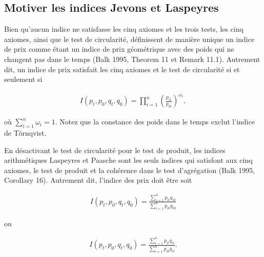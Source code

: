 \documentclass[
]{article}
\begin{document}
\hypertarget{motiver-les-indices-jevons-et-laspeyres}{%
\subsection{Motiver les indices Jevons et Laspeyres}\label{motiver-les-indices-jevons-et-laspeyres}}

Bien qu'aucun indice ne satisfasse les cinq axiomes et les trois tests, les cinq axiomes, ainsi que le test de circularité, définissent de manière unique un indice de prix comme étant un indice de prix géométrique avec des poids qui ne changent pas dans le temps (Balk 1995, Theorem 11 et Remark 11.1). Autrement dit, un indice de prix satisfait les cinq axiomes et le test de circularité si et seulement si

\begin{align*}
I(p_{t}, p_{0}, q_{t}, q_{0}) = \prod_{i = 1}^{n} \left(\frac{p_{it}}{p_{i0} } \right)^{\omega_{i}},
\end{align*}

où \(\sum_{i = 1}^{n} \omega_{i} = 1\). Notez que la constance des poids dans le temps exclut l'indice de Törnqvist.

En désactivant le test de circularité pour le test de produit, les indices arithmétiques Laspeyres et Paasche sont les seuls indices qui satisfont aux cinq axiomes, le test de produit et la cohérence dans le test d'agrégation (Balk 1995, Corollary 16). Autrement dit, l'indice des prix doit être soit

\begin{align*}
I(p_{t}, p_{0}, q_{t}, q_{0}) = \frac{\sum_{i = 1}^{n} p_{it} q_{i0}}{\sum_{i = 1}^{n} p_{i0} q_{i0}}
\end{align*}

ou

\begin{align*}
I(p_{t}, p_{0}, q_{t}, q_{0}) = \frac{\sum_{i = 1}^{n} p_{it} q_{it}}{\sum_{i = 1}^{n} p_{i0} q_{it}}.
\end{align*}
\end{document}
